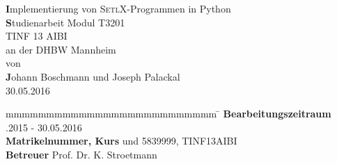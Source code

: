 
\begin{titlepage}
	\enlargethispage{20mm}
	\begin{center}
		
		\vspace*{12mm}	{\LARGE\textbf Implementierung von \textsc{SetlX}-Programmen in Python }\\
		\vspace*{12mm}	{\large\textbf Studienarbeit Modul T3201}\\
		\vspace*{12mm}	TINF 13 AIBI \\
    \vspace*{3mm}		an der DHBW Mannheim \\
		\vspace*{12mm}	von \\
		\vspace*{3mm}		{\large\textbf Johann Boschmann und Joseph Palackal}\\
		\vspace*{12mm}	30.05.2016\\
	\end{center}
	\vfill
	\begin{spacing}{1.2}
	\begin{tabbing}
		mmmmmmmmmmmmmmmmmmmmmmmmmm             \= \kill
		\textbf{Bearbeitungszeitraum}          .2015 - 30.05.2016\\
		\textbf{Matrikelnummer, Kurs}           und 5839999, TINF13AIBI\\
		\textbf{Betreuer}                      \>  Prof. Dr. K. Stroetmann\\
	\end{tabbing}
	\end{spacing}
\end{titlepage}
